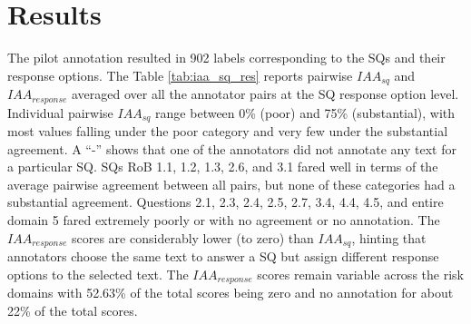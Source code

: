 \documentclass{IOS-Book-Article}
\begin{document}
\section{Results}
\label{sec:results}
%
The pilot annotation resulted in 902 labels corresponding to the SQs and their response options.
The Table \ref{tab:iaa_sq_res} reports pairwise $IAA_{sq}$ and $IAA_{response}$ averaged over all the annotator pairs at the SQ response option level.
Individual pairwise $IAA_{sq}$ range between 0\% (poor) and 75\% (substantial), with most values falling under the poor category and very few under the substantial agreement.
A ``-'' shows that one of the annotators did not annotate any text for a particular SQ. 
SQs RoB 1.1, 1.2, 1.3, 2.6, and 3.1 fared well in terms of the average pairwise agreement between all pairs, but none of these categories had a substantial agreement.
Questions 2.1, 2.3, 2.4, 2.5, 2.7, 3.4, 4.4, 4.5, and entire domain 5 fared extremely poorly or with no agreement or no annotation.
The $IAA_{response}$ scores are considerably lower (to zero) than $IAA_{sq}$, hinting that annotators choose the same text to answer a SQ but assign different response options to the selected text. 
The $IAA_{response}$ scores remain variable across the risk domains with 52.63\% of the total scores being zero and no annotation for about 22\% of the total scores.
%
\end{document}
